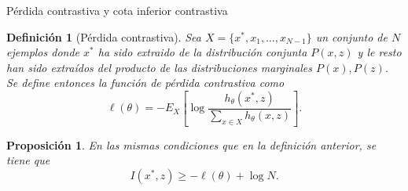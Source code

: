 \documentclass[aspectratio=169]{beamer}
\newtheorem{defi}{Definición}
\newtheorem{prop}{Proposición}
\begin{document}
  
  \begin{frame}{Pérdida contrastiva y cota inferior contrastiva}
    
    \begin{defi}[Pérdida contrastiva]
      Sea \(X =\{x^*,x_1,\dots,x_{N-1}\}\) un conjunto de \(N\) ejemplos donde $x^*$ ha sido extraido de la distribución conjunta \(P(x,z)\) y le resto han sido extraídos del producto de las distribuciones marginales \(P(x),P(z)\). Se define entonces la función de pérdida contrastiva como  
      \[ 
        \ell(\theta) = - E_X \left[ \log \frac{h_\theta(x^*,z)}{\sum_{x \in X}h_\theta(x,z)}\right]. 
        \]
    \end{defi}

    \pause
    \begin{prop}
      En las mismas condiciones que en la definición anterior, se tiene que
      \[
        I(x^*,z) \geq -  \ell(\theta) + \log N.
      \]
    \end{prop}
  
  \end{frame}
  
\end{document}

